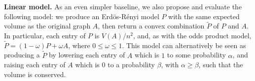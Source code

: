 \noindent\textbf{Linear model.} 
 As an even simpler baseline, we also propose and evaluate the following model: we produce an Erd\"{o}s-R\'{e}nyi model $P$ with the same expected volume as the original graph $A$, then return a convex combination $\tilde{P}$ of $P$ and $A$. In particular, each entry of $P$ is $V(A) / n^2$, and, as with the odds product model, $\tilde{P} = (1-\omega) P + \omega A$, where $0 \leq \omega \leq 1$. This model can alternatively be seen as producing a $\tilde{P}$ by lowering each entry of $A$ which is $1$ to some probability $\alpha$, and raising each entry of $A$ which is $0$ to a probability $\beta$, with $\alpha \geq \beta$, such that the volume is conserved. %
